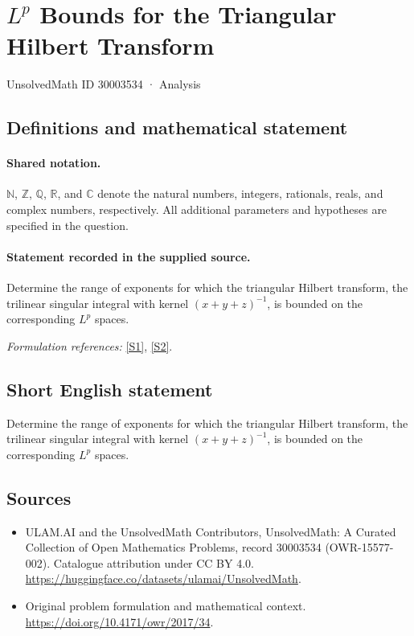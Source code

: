 \documentclass[11pt]{article}
\newcommand{\sref}[2]{\hyperlink{source:#1:#2}{[S#2]}}
\begin{document}
\setcounter{section}{30003533}
\section{\texorpdfstring{$L^p$ Bounds for the Triangular Hilbert Transform}{L\textasciicircum{}p Bounds for the Triangular Hilbert Transform}}\label{30003534}
{\small UnsolvedMath ID 30003534 · Analysis}
\subsection{Definitions and mathematical statement}

\paragraph{Shared notation.}$\mathbb N$, $\mathbb Z$, $\mathbb Q$, $\mathbb R$, and $\mathbb C$ denote the natural numbers, integers, rationals, reals, and complex numbers, respectively. All additional parameters and hypotheses are specified in the question.


\paragraph{Statement recorded in the supplied source.}
Determine the range of exponents for which the triangular Hilbert transform, the trilinear singular integral with kernel $(x+y+z)^{-1}$, is bounded on the corresponding $L^p$ spaces.
\par\smallskip\textit{Formulation references:} \sref{30003534}{1}, \sref{30003534}{2}.
\subsection{Short English statement}
Determine the range of exponents for which the triangular Hilbert transform, the trilinear singular integral with kernel $(x+y+z)^{-1}$, is bounded on the corresponding $L^p$ spaces.
\subsection{Sources}
\begin{itemize}
\item[\hypertarget{source:30003534:1}{S1}] ULAM.AI and the UnsolvedMath Contributors, UnsolvedMath: A Curated Collection of Open Mathematics Problems, record 30003534 (OWR-15577-002). Catalogue attribution under CC BY 4.0.
\url{https://huggingface.co/datasets/ulamai/UnsolvedMath}.
\item[\hypertarget{source:30003534:2}{S2}] Original problem formulation and mathematical context.
\url{https://doi.org/10.4171/owr/2017/34}.
\end{itemize}
\label{end:30003534}
\end{document}

